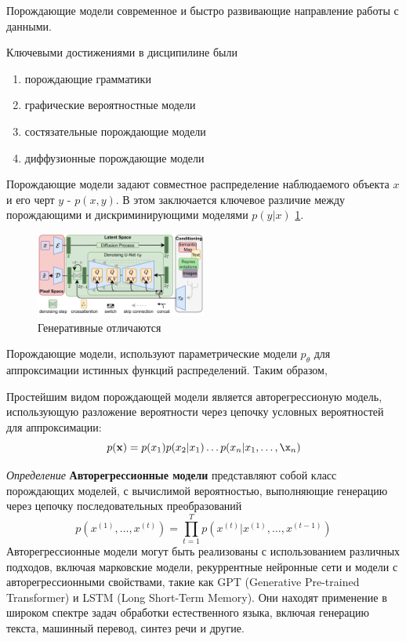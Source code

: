 
Порождающие модели современное и быстро развивающие направление работы с данными.

Ключевыми достижениями в дисципилине были \begin{enumerate}
    \item порождающие грамматики \cite{chomsky2002syntactic}
    \item графические вероятностные модели \cite{pearl1988probabilistic}
    \item состязательные порождающие модели \cite{goodfellow2020generative}
    \item диффузионные порождающие модели \cite{song2020score}
\end{enumerate}

Порождающие модели задают совместное распределение наблюдаемого объекта $x$ и его черт $y$ -  $p(x,y)$. В этом заключается 
ключевое различие между порождающими и дискриминирующими моделями $p(y|x)$ \ref{discr_vs_gen}.

\begin{figure}[h]
    \centering
    \includegraphics[width=0.5\textwidth]{assets/ml/generation/stable_diffusion.png}
    \caption{Генеративные отличаются}
    \label{discr_vs_gen}
\end{figure}


Порождающие модели, используют параметрические модели $p_\theta$ для аппроксимации истинных функций распределений.
Таким образом,


Простейшим видом порождающей модели является авторегрессионую модель,
 использующую разложение вероятности через цепочку условных вероятностей для аппроксимации:
\begin{equation}
    p(\mathbf{x}) = p(x_1) p(x_2 |x_1) \dots p(x_n|x_1,\dots,\x_n)
\end{equation}

\textit{Определение } \textbf{Авторегрессионные модели} представляют собой класс порождающих моделей,
с вычислимой  вероятностью, выполняющие генерацию через цепочку последовательных преобразований \begin{equation}
    p(x^{(1)},\dots,x^{(t)}) = \prod_{t=1}^T p(x^{(t)}|x^{(1)},\dots,x^{(t-1)})
\end{equation}
Авторегрессионные модели могут быть реализованы с использованием различных подходов, 
включая марковские модели, рекуррентные нейронные сети и модели с авторегрессионными свойствами, такие как GPT (Generative Pre-trained Transformer) и LSTM (Long Short-Term Memory). 
Они находят применение в широком спектре задач обработки естественного языка, включая генерацию текста, машинный перевод, синтез речи и другие.


